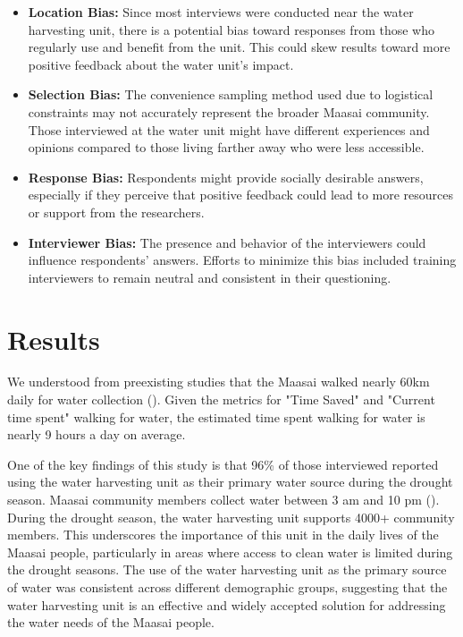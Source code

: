 \documentclass[10pt, twocolumn]{article}
\begin{document}
\begin{itemize}
    \item \textbf{Location Bias:} Since most interviews were conducted near the water harvesting unit, there is a potential bias toward responses from those who regularly use and benefit from the unit. This could skew results toward more positive feedback about the water unit's impact.
    \item \textbf{Selection Bias:} The convenience sampling method used due to logistical constraints may not accurately represent the broader Maasai community. Those interviewed at the water unit might have different experiences and opinions compared to those living farther away who were less accessible.
    \item \textbf{Response Bias:} Respondents might provide socially desirable answers, especially if they perceive that positive feedback could lead to more resources or support from the researchers.
    \item \textbf{Interviewer Bias:} The presence and behavior of the interviewers could influence respondents' answers. Efforts to minimize this bias included training interviewers to remain neutral and consistent in their questioning.
\end{itemize}

















\section{Results}

We understood from preexisting studies that the Maasai walked nearly 60km daily for water collection (\autocite{choi2014salient}). Given the metrics for "Time Saved" and "Current time spent" walking for water, the estimated time spent walking for water is nearly 9 hours a day on average.

One of the key findings of this study is that 96\% of those interviewed reported using the water harvesting unit as their primary water source during the drought season. Maasai community members collect water between 3 am and 10 pm (\autocite{Google}). During the drought season, the water harvesting unit supports 4000+ community members. This underscores the importance of this unit in the daily lives of the Maasai people, particularly in areas where access to clean water is limited during the drought seasons. The use of the water harvesting unit as the primary source of water was consistent across different demographic groups, suggesting that the water harvesting unit is an effective and widely accepted solution for addressing the water needs of the Maasai people.
\end{document}
